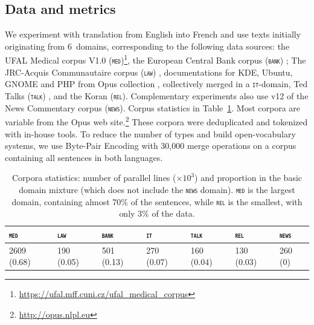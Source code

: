 \documentclass[11pt,a4paper]{article}
\newcommand{\domain}[1]{\texttt{\textsc{#1}}}
\begin{document}
\subsection{Data and metrics \label{ssec:corpora}}
We experiment with translation from English into French and use texts initially originating from 6~domains, corresponding to the following data sources: the UFAL Medical corpus V1.0 (\domain{med})\footnote{\url{https://ufal.mff.cuni.cz/ufal_medical_corpus}}, the European Central Bank corpus (\domain{bank}) \cite{Tiedemann12parallel}; The JRC-Acquis Communautaire corpus (\domain{law}) \cite{Steinberger06acquis}, documentations for KDE, Ubuntu, GNOME and PHP from Opus collection \cite{Tiedemann09news}, collectively merged in a \domain{it}-domain, Ted Talks (\domain{talk}) \cite{Cettolo12wit}, and the Koran (\domain{rel}). Complementary experiments also use v12 of the News Commentary corpus (\domain{news}). Corpus statistics in Table~\ref{tab:Corpora-en-fr}.  Most corpora are variable from the Opus web site.\footnote{\url{http://opus.nlpl.eu}} These corpora were deduplicated and tokenized with in-house tools. To reduce the number of types and build open-vocabulary systems, we use Byte-Pair Encoding \cite{Sennrich16BPE} with 30,000 merge operations on a corpus containing all sentences in both languages.%

\begin{table}[htbp]
  \centering
  \begin{tabular}{ |lllllll|} %
    \hline
    \domain{med} & \domain{law} & \domain{bank} & \domain{it} & \domain{talk} & \domain{rel} & \domain{news} \\
    \hline
    2609 (0.68) & 190 (0.05)  & 501 (0.13) & 270 (0.07) & 160 (0.04) & 130 (0.03) & 260 (0) \\
    \hline
  \end{tabular}
\caption{Corpora statistics: number of parallel lines ($\times 10^3$) and proportion in the basic domain mixture (which does not include the \domain{news} domain). \domain{med} is the largest domain, containing almost 70\% of the sentences, while \domain{rel} is the smallest, with only 3\% of the data.}
\label{tab:Corpora-en-fr}
\end{table}
\end{document}
